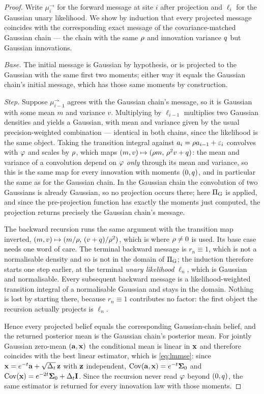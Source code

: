 \begin{proof}
Write $\mu_i^{\rightarrow}$ for the forward message at site $i$ after projection and
$\ell_i$ for the Gaussian unary likelihood. We show by induction that every projected message
coincides with the corresponding exact message of the covariance-matched Gaussian chain --- the
chain with the same $\rho$ and innovation variance $q$ but Gaussian innovations.

\emph{Base.} The initial message is Gaussian by hypothesis, or is projected to the Gaussian with
the same first two moments; either way it equals the Gaussian chain's initial message, which has
those same moments by construction.

\emph{Step.} Suppose $\mu_{i-1}^{\rightarrow}$ agrees with the Gaussian chain's message, so it is
Gaussian with some mean $m$ and variance $v$. Multiplying by $\ell_{i-1}$ multiplies two Gaussian
densities and yields a Gaussian, with mean and variance given by the usual precision-weighted
combination --- identical in both chains, since the likelihood is the same object. Taking the
transition integral against $a_i = \rho a_{i-1} + \varepsilon_i$ convolves with $\varphi$ and
scales by $\rho$, which maps $(m,v) \mapsto (\rho m,\, \rho^2 v + q)$: the mean and variance
of a convolution depend on $\varphi$ \emph{only} through its mean and variance, so this is the same
map for every innovation with moments $(0,q)$, and in particular the same as for the Gaussian
chain. In the Gaussian chain the convolution of two Gaussians is already Gaussian, so no
projection occurs there; here $\Pi_{\mathrm{G}}$ is applied, and since the pre-projection function has
exactly the moments just computed, the projection returns precisely the Gaussian chain's message.

The backward recursion runs the same argument with the transition map inverted, $(m,v)\mapsto
(m/\rho,\,(v+q)/\rho^2)$, which is where $\rho\neq0$ is used. Its base case needs one word
of care. The terminal backward message is $r_n\equiv 1$, which is not a normalisable density and
so is not in the domain of $\Pi_{\mathrm{G}}$; the induction therefore starts one step earlier, at the
terminal \emph{unary likelihood} $\ell_n$, which is Gaussian and normalisable. Every subsequent
backward message is a likelihood-weighted transition integral of a normalisable Gaussian and stays
in the domain. Nothing is lost by starting there, because $r_n\equiv1$ contributes no factor: the
first object the recursion actually projects is $\ell_n$.

Hence every projected belief equals the corresponding Gaussian-chain belief, and the returned
posterior mean is the Gaussian chain's posterior mean. For jointly Gaussian zero-mean
$(\mathbf{a},\mathbf{x})$ the conditional mean is linear in $\mathbf{x}$ and therefore coincides with the best linear
estimator, which is \eqref{eq:lmmse}: since $\mathbf{x} = e^{-t}\mathbf{a} + \sqrt{\Delta_t}\,\mathbf{z}$ with
$\mathbf{z}$ independent, $\operatorname{Cov}(\mathbf{a},\mathbf{x})=e^{-t}\mathbf{\Sigma}_0$ and $\operatorname{Cov}(\mathbf{x})=e^{-2t}\mathbf{\Sigma}_0+\Delta_t\mathbf{I}$. Since
the recursion never read $\varphi$ beyond $(0,q)$, the same estimator is returned for every
innovation law with those moments.
\end{proof}

